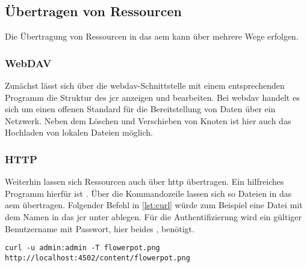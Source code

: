 \subsection{Übertragen von Ressourcen}
Die Übertragung von Ressourcen in das \ac{aem} kann über mehrere Wege erfolgen.

\subsubsection{WebDAV}
Zunächst lässt sich über die \ac{webdav}-Schnittstelle mit einem entsprechenden Programm die Struktur des \ac{jcr} anzeigen und bearbeiten. Bei \acf{webdav} handelt es sich um einen offenen Standard für die Bereitstellung von Daten über ein Netzwerk. Neben dem Löschen und Verschieben von Knoten ist hier auch das Hochladen von lokalen Dateien möglich.

\subsubsection{HTTP}
Weiterhin lassen sich Ressourcen auch über \ac{http} übertragen. Ein hilfreiches Programm hierfür ist  \cite{Stenberg2017}. Über die Kommandozeile lassen sich so Dateien in das \ac{aem} übertragen. Folgender Befehl in \autoref{lst:curl} würde zum Beispiel eine Datei mit dem Namen  in das \ac{jcr} unter  ablegen. Für die Authentifizierung wird ein gültiger Benutzername mit Passwort, hier beides , benötigt.

\begin{lstlisting}[style=jcr, caption=Eine Datei mit curl in das AEM übertragen, label=lst:curl]
curl -u admin:admin -T flowerpot.png http://localhost:4502/content/flowerpot.png
\end{lstlisting}


